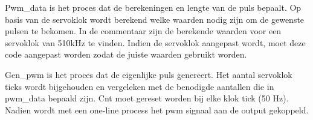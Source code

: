 
Pwm\_data is het proces dat de berekeningen en lengte van de puls bepaalt. Op basis van de servoklok wordt berekend welke waarden nodig zijn om de gewenste pulsen te bekomen. In de commentaar zijn de berekende waarden voor een servoklok van 510kHz te vinden. Indien de servoklok aangepast wordt, moet deze code aangepast worden zodat de juiste waarden gebruikt worden.


Gen\_pwm is het proces dat de eigenlijke puls genereert. Het aantal servoklok ticks wordt bijgehouden en vergeleken met de benodigde aantallen die in pwm\_data bepaald zijn. Cnt moet gereset worden bij elke klok tick (50 Hz).\\
Nadien wordt met een one-line process het pwm signaal aan de output gekoppeld. \label{one-liner}

